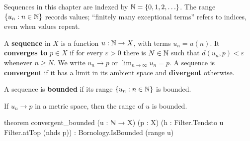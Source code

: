 Sequences in this chapter are indexed by $\mathbb{N}=\{0,1,2,\ldots\}$.
The range $\{u_n:n\in\mathbb{N}\}$ records values; ``finitely many exceptional terms'' refers to indices,
even when values repeat.

\begin{definition}
  \label{ma:def:sequence-convergence}
  A \textbf{sequence} in $X$ is a function $u:\mathbb{N}\to X$, with terms $u_n=u(n)$.
  It \textbf{converges to} $p\in X$ if for every $\varepsilon>0$ there is $N\in\mathbb{N}$ such that
  $d(u_n,p)<\varepsilon$ whenever $n\geq N$.
  We write $u_n\to p$ or $\lim_{n\to\infty}u_n=p$.
  A sequence is \textbf{convergent} if it has a limit in its ambient space and \textbf{divergent}
  otherwise.
\end{definition}

\begin{definition}
  \label{ma:def:bounded-sequence}
  A sequence is \textbf{bounded} if its range $\{u_n:n\in\mathbb{N}\}$ is bounded.
\end{definition}

\begin{lemma}
  \label{ma:lem:convergent-bounded}
  If $u_n\to p$ in a metric space, then the range of $u$ is bounded.

  \begin{lean}
    theorem convergent_bounded (u : ℕ → X) (p : X) (h : Filter.Tendsto u Filter.atTop (nhds p)) :
        Bornology.IsBounded (range u)
  \end{lean}
\end{lemma}

